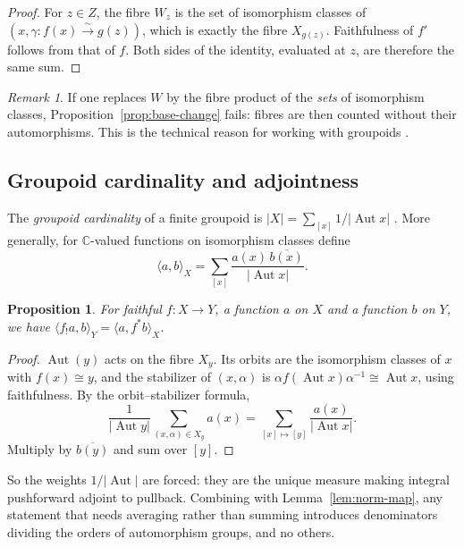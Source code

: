 \documentclass[11pt]{amsart}
\newtheorem{proposition}[theorem]{Proposition}
\theoremstyle{definition}
\theoremstyle{remark}
\newtheorem{remark}[theorem]{Remark}
\DeclareMathOperator{\Aut}{Aut}
\newcommand{\C}{\mathbb{C}}
\begin{document}
\begin{proof}
For $z\in Z$, the fibre $W_z$ is the set of isomorphism classes of $(x,\gamma\colon f(x)\xrightarrow{\sim}g(z))$, which is exactly the fibre $X_{g(z)}$. Faithfulness of $f'$ follows from that of $f$. Both sides of the identity, evaluated at $z$, are therefore the same sum.
\end{proof}

\begin{remark}
If one replaces $W$ by the fibre product of the \emph{sets} of isomorphism classes, Proposition~\ref{prop:base-change} fails: fibres are then counted without their automorphisms. This is the technical reason for working with groupoids \cite{BaezHoffnungWalker}.
\end{remark}

\subsection{Groupoid cardinality and adjointness}
The \emph{groupoid cardinality} of a finite groupoid is $|X|=\sum_{[x]}1/|\Aut x|$ \cite{nLab-cardinality}. More generally, for $\C$-valued functions on isomorphism classes define
\[
\langle a,b\rangle_X=\sum_{[x]}\frac{a(x)\,\overline{b(x)}}{|\Aut x|}.
\]

\begin{proposition}\label{prop:adjoint}
For faithful $f\colon X\to Y$, a function $a$ on $X$ and a function $b$ on $Y$, we have $\langle f_!a,b\rangle_Y=\langle a,f^*b\rangle_X$.
\end{proposition}

\begin{proof}
$\Aut(y)$ acts on the fibre $X_y$. Its orbits are the isomorphism classes of $x$ with $f(x)\cong y$, and the stabilizer of $(x,\alpha)$ is $\alpha f(\Aut x)\alpha^{-1}\cong\Aut x$, using faithfulness. By the orbit--stabilizer formula,
\[
\frac{1}{|\Aut y|}\sum_{(x,\alpha)\in X_y}a(x)=\sum_{[x]\mapsto[y]}\frac{a(x)}{|\Aut x|}.
\]
Multiply by $\overline{b(y)}$ and sum over $[y]$.
\end{proof}

So the weights $1/|\Aut|$ are forced: they are the unique measure making integral pushforward adjoint to pullback. Combining with Lemma~\ref{lem:norm-map}, any statement that needs averaging rather than summing introduces denominators dividing the orders of automorphism groups, and no others.
\end{document}
